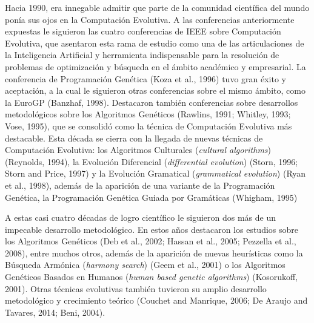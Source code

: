 \documentclass[spanish,a4paper,12pt,twoside]{report}
\begin{document}
  Hacia 1990, era innegable admitir que parte de la comunidad científica del mundo ponía sus ojos en la Computación Evolutiva. A las conferencias anteriormente expuestas le siguieron las cuatro conferencias de IEEE sobre Computación Evolutiva, que asentaron esta rama de estudio como una de las articulaciones de la Inteligencia Artificial y herramienta indispensable para la resolución de problemas de optimización y búsqueda en el ámbito académico y empresarial. La conferencia de Programación Genética (Koza et al., 1996) tuvo gran éxito y aceptación, a la cual le siguieron otras conferencias sobre el mismo ámbito, como la EuroGP (Banzhaf, 1998). Destacaron también conferencias sobre desarrollos metodológicos sobre los Algoritmos Genéticos (Rawlins, 1991; Whitley, 1993; Vose, 1995), que se consolidó como la técnica de Computación Evolutiva más destacable. Esta década se cierra con la llegada de nuevas técnicas de Computación Evolutiva: los Algoritmos Culturales (\emph{cultural algorithms}) (Reynolds, 1994), la Evolución Diferencial (\emph{differential evolution}) (Storn, 1996; Storn and Price, 1997) y la Evolución Gramatical (\emph{grammatical evolution}) (Ryan et al., 1998), además de la aparición de una variante de la Programación Genética, la Programación Genética Guiada por Gramáticas (Whigham, 1995) \par
  A estas casi cuatro décadas de logro científico le siguieron dos más de un impecable desarrollo metodológico. En estos años destacaron los estudios sobre los Algoritmos Genéticos (Deb et al., 2002; Hassan et al., 2005; Pezzella et al., 2008), entre muchos otros, además de la aparición de nuevas heurísticas como la Búsqueda Armónica (\emph{harmony search}) (Geem et al., 2001) o los Algoritmos Genéticos Basados en Humanos (\emph{human based genetic algorithms}) (Kosorukoff, 2001). Otras técnicas evolutivas también tuvieron su amplio desarrollo metodológico y crecimiento teórico (Couchet and Manrique, 2006; De Araujo and Tavares, 2014; Beni, 2004).
\end{document}
